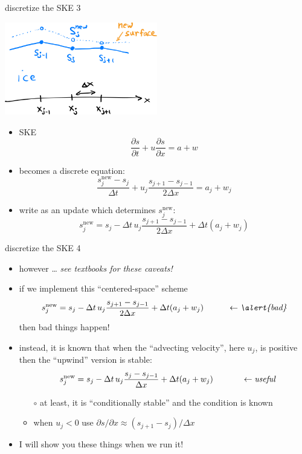 \documentclass[10pt,dvipsnames]{beamer}
\newcommand{\snew}{s^{\text{new}}}
\newcommand{\comm}[1]{{\footnotesize \hfill \emph{#1}}}
\begin{document}
\begin{frame}{discretize the SKE 3}
\begin{center}
\includegraphics[width=0.5\textwidth]{surfacenotation}
\end{center}

\begin{itemize}
\item SKE
\begin{equation*}
\frac{\partial s}{\partial t} + u \frac{\partial s}{\partial x} = a + w
\end{equation*}
\item becomes a discrete equation:
    $$\frac{\snew_j - s_j}{\Delta t} + u_j \frac{s_{j+1} - s_{j-1}}{2\Delta x} = a_j + w_j$$
\item write as an update which determines $\snew_j$:
	$$\snew_j = s_j - \Delta t\, u_j \frac{s_{j+1}-s_{j-1}}{2\Delta x} + \Delta t (a_j + w_j)$$
\end{itemize}
\end{frame}

\begin{frame}{discretize the SKE 4}

\begin{itemize}
\item \alert{however \dots} \comm{see textbooks for these caveats!}
\item if we implement this ``centered-space'' scheme
	$$\snew_j = s_j - \Delta t\, u_j \frac{s_{j+1}-s_{j-1}}{2\Delta x} + \Delta t (a_j + w_j) \hspace{1.0cm} \leftarrow \text{\emph{\alert{bad}}}$$
then bad things happen!
\item instead, it is known that when the ``advecting velocity'', here $u_j$, is positive then the ``upwind'' version is stable:
	$$\hspace{3mm} \snew_j = s_j - \Delta t\, u_j \frac{s_j-s_{j-1}}{\Delta x} + \Delta t (a_j + w_j) \hfill \hspace{1.2cm} \leftarrow \text{\emph{useful}}$$

    \begin{itemize}
    \item[$\circ$] at least, it is ``conditionally stable'' and the condition is known
    \item<3>[$\circ$] when $u_j<0$ use $\partial s/\partial x \approx (s_{j+1}-s_j)/\Delta x$
    \end{itemize}

\bigskip
\item<2->[] \alert{I will show you these things when we run it!}
\end{itemize}
\end{frame}
\end{document}
